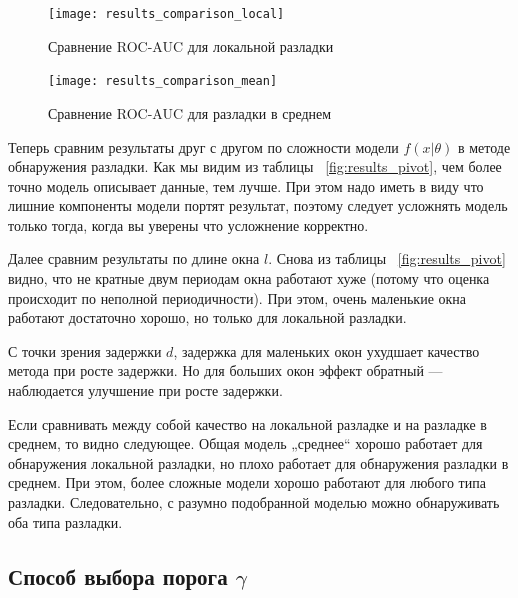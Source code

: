 \documentclass[%
12pt,
master,  %
natbib,      %
subf,        %
substylefile = spbu.rtx,
href,        %
colorlinks,  %
]{disser}
\begin{document}
\begin{figure}[!hhh]
	\begin{center}
		\texttt{[image: results\_comparison\_local]}
	\end{center}
	\vspace{-5mm}\caption{Сравнение ROC-AUC для локальной разладки}
	\label{fig:results_comparison_local}
\end{figure}

\begin{figure}[!hhh]
	\begin{center}
		\texttt{[image: results\_comparison\_mean]}
	\end{center}
	\vspace{-5mm}\caption{Сравнение ROC-AUC для разладки в среднем}
	\label{fig:results_comparison_mean}
\end{figure}


Теперь сравним результаты друг с другом по сложности модели $f(x| \theta)$ в методе обнаружения разладки. Как мы видим из таблицы ~\ref{fig:results_pivot}, чем более точно модель описывает данные, тем лучше. При этом надо иметь в виду что лишние компоненты модели портят результат, поэтому следует усложнять модель только тогда, когда вы уверены что усложнение корректно.

Далее сравним результаты по длине окна $l$. Снова из таблицы ~\ref{fig:results_pivot} видно, что не кратные двум периодам окна работают хуже (потому что оценка происходит по неполной периодичности). При этом, очень маленькие окна работают достаточно хорошо, но только для локальной разладки.

С точки зрения задержки $d$, задержка для маленьких окон ухудшает качество метода при росте задержки. Но для больших окон эффект обратный --- наблюдается улучшение при росте задержки. 

Если сравнивать между собой качество на локальной разладке и на разладке в среднем, то видно следующее. Общая модель „среднее“ хорошо работает для обнаружения локальной разладки, но плохо работает для обнаружения разладки в среднем. При этом, более сложные модели хорошо работают для любого типа разладки. Следовательно, с разумно подобранной моделью можно обнаруживать оба типа разладки.

\subsection{Способ выбора порога $\gamma$}
\end{document}
